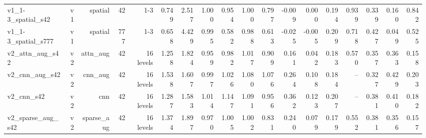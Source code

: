 \begin{table}[t]
\begin{tabular}{lrrrrrrrrrrrrrrrrr}
v1\_1-3\_spatial\_s42 & v1 & spatial & 42 & 1-3 & 0.749 & 2.517 & 1.000 & 0.954 & 1.000 & 0.797 & -0.009 & 0.000 & 0.194 & 0.939 & 0.339 & 0.160 & 0.842 \\
v1\_1-3\_spatial\_s777 & v1 & spatial & 777 & 1-3 & 0.658 & 4.429 & 0.995 & 0.582 & 0.988 & 0.613 & -0.025 & -0.005 & 0.209 & 0.718 & 0.427 & 0.049 & 0.525 \\
v2\_attn\_aug\_s42 & v2 & attn\_aug & 42 & 16 levels & 1.258 & 1.824 & 0.959 & 0.982 & 1.017 & 0.909 & 0.161 & 0.042 & 0.183 & 0.570 & 0.357 & 0.363 & 0.158 \\
v2\_cnn\_aug\_s42 & v2 & cnn\_aug & 42 & 16 levels & 1.538 & 1.607 & 0.997 & 1.026 & 1.080 & 1.076 & 0.264 & 0.108 & 0.184 & -- & 0.327 & 0.429 & 0.203 \\
v2\_cnn\_s42 & v2 & cnn & 42 & 16 levels & 1.287 & 1.583 & 1.014 & 1.147 & 1.091 & 0.956 & 0.362 & 0.123 & 0.207 & -- & 0.381 & 0.410 & 0.182 \\
v2\_sparse\_aug\_s42 & v2 & sparse\_aug & 42 & 16 levels & 1.374 & 1.897 & 0.970 & 1.005 & 1.002 & 0.831 & 0.240 & 0.079 & 0.179 & 0.552 & 0.381 & 0.356 & 0.157 \\
\bottomrule
\end{tabular}
\end{table}
